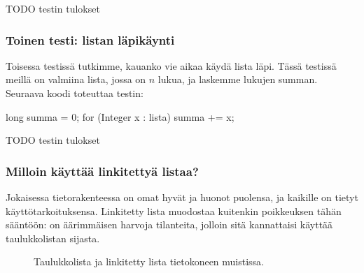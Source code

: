 
TODO testin tulokset

\subsubsection{Toinen testi: listan läpikäynti}

Toisessa testissä tutkimme, kauanko vie aikaa käydä lista läpi.
Tässä testissä meillä on valmiina lista,
jossa on $n$ lukua, ja laskemme lukujen summan.
Seuraava koodi toteuttaa testin:

\begin{code}
long summa = 0;
for (Integer x : lista) {
    summa += x;
}
\end{code}

TODO testin tulokset

\subsubsection{Milloin käyttää linkitettyä listaa?}

Jokaisessa tietorakenteessa on omat hyvät ja huonot puolensa,
ja kaikille on tietyt käyttötarkoituksensa.
Linkitetty lista muodostaa kuitenkin poikkeuksen tähän sääntöön:
on äärimmäisen harvoja tilanteita, jolloin sitä kannattaisi
käyttää taulukkolistan sijasta.

\begin{figure}
\center
{}
\caption{Taulukkolista ja linkitetty lista tietokoneen muistissa.}
\label{fig:taulin}
\end{figure}

